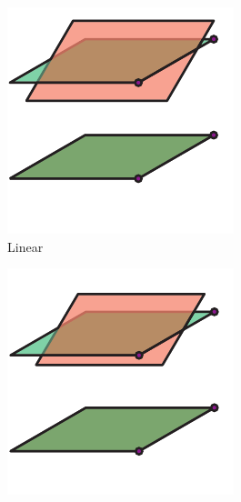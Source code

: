\begin{figure}
    \begin{subfigure}[t]{0.2\textwidth}
        \centering
        \includegraphics[width=\textwidth]{geometry/linear}
        \caption{Linear}\label{fig:geometry/linear}
    \end{subfigure}\hfill
    \begin{subfigure}[t]{0.2\textwidth}
        \centering
        \includegraphics[width=\textwidth]{geometry/affine}

\end{subfigure}
\end{figure}
